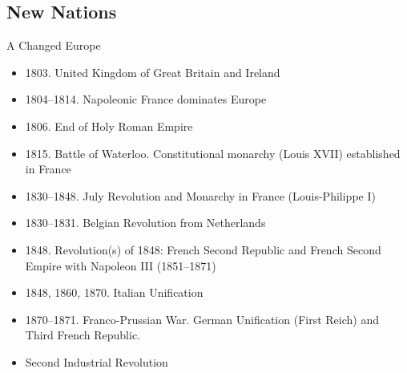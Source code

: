 
\subsection{New Nations}
\begin{frame}{A Changed Europe}
	\begin{itemize}
		\item<1-4,6->1803. United Kingdom of Great Britain and Ireland
		\item<2-4,6->1804--1814. Napoleonic France dominates Europe
		\item<3-4,6->1806. End of Holy Roman Empire
		\item<4,6->1815. Battle of Waterloo. Constitutional monarchy (Louis XVII) established in France
		\item<6->1830--1848. July Revolution and Monarchy in France (Louis-Philippe I)
		\item<7->1830--1831. Belgian Revolution from Netherlands
		\item<8->1848. Revolution(s) of 1848: French Second Republic and French Second Empire with Napoleon III (1851--1871)
		\item<9->1848, 1860, 1870. Italian Unification
		\item<10->1870--1871. Franco-Prussian War. German Unification (First Reich) and Third French Republic.
		\item<11->Second Industrial Revolution
	\end{itemize}
\end{frame}

